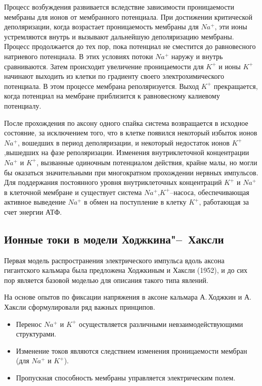 \documentclass[12pt,a4paper,oneside]{book}
\begin{document}
Процесс возбуждения развивается вследствие зависимости проницаемости мембраны для ионов от мембранного потенциала. При достижении критической деполяризации, когда возрастает проницаемость мембраны для $Na^+$, эти ионы устремляются внутрь и вызывают дальнейшую деполяризацию мембраны. Процесс продолжается до тех пор, пока потенциал не сместится до равновесного натриевого потенциала. В этих условиях потоки $Na^+$ наружу и внутрь сравниваются. Затем происходит увеличение проницаемости для $K^+$ и ионы $K^+$ начинают выходить из клетки по градиенту своего электрохимического потенциала. В этом процессе мембрана реполяризуется. Выход $K^+$ прекращается, когда потенциал на мембране приблизится к равновесному калиевому потенциалу. 

После прохождения по аксону одного спайка система возвращается в исходное состояние, за исключением того, что в клетке появился некоторый избыток ионов $Na^+$, вошедших в период деполяризации, и некоторый недостаток ионов $K^+$,вышедших на фазе реполяризации. Изменения внутриклеточной концентрации $Na^+$ и $K^+$, вызванные одиночным потенциалом действия, крайне малы, но могли бы оказаться значительными при многократном прохождении нервных импульсов. Для поддержания постоянного уровня внутриклеточных концентраций $K^+$ и $Na^+$ в клеточной мембране и существует система $Na^+$,$K^+$--насоса, обеспечивающая активное выведение $Na^+$ в обмен на поступление в клетку $K^+$, работающая за счет энергии АТФ. 




\subsection{Ионные токи в модели Ходжкина"--~Хаксли}

Первая модель распространения электрического импульса вдоль аксона гигантского кальмара была предложена Ходжкиным и Хаксли (1952), и до сих пор является базовой моделью для описания такого типа явлений.

На основе опытов по фиксации напряжения в аксоне кальмара А.\,Ходжкин и А.\,Хаксли сформулировали ряд важных принципов.

\begin{itemize}
\item[1.] Перенос $Na^+$ и $K^+$ осуществляется различными невзаимодействующими структурами.
\item[2.] Изменение токов являются следствием изменения проницаемости мембран (для $Na^+$ и $K^+$).
\item[3.] Пропускная способность мембраны управляется электрическим полем.
\end{itemize}
\end{document}
